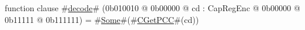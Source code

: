 function clause #\hyperref[sailMIPSzdecode]{decode}# (0b010010 @ 0b00000 @ cd : CapRegEnc @    0b00000 @    0b11111 @ 0b111111) = #\hyperref[sailMIPSzSome]{Some}#(#\hyperref[sailMIPSzCGetPCC]{CGetPCC}#(cd))
